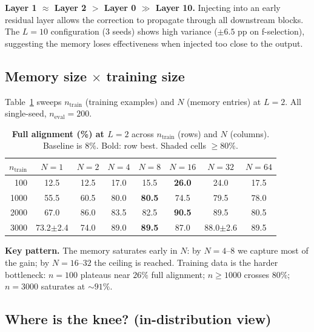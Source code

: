\documentclass[10pt]{article}
\begin{document}
\textbf{Layer 1 $\approx$ Layer 2 $>$ Layer 0 $\gg$ Layer 10.} Injecting
into an early residual layer allows the correction to propagate through
all downstream blocks. The $L{=}10$ configuration (3 seeds) shows high
variance ($\pm 6.5$ pp on f-selection), suggesting the memory loses
effectiveness when injected too close to the output.

\subsection{Memory size $\times$ training size}

Table~\ref{tab:grid} sweeps $n_\text{train}$ (training examples) and $N$
(memory entries) at $L{=}2$. All single-seed, $n_\text{eval}{=}200$.

\begin{table}[ht]
  \centering\small
  \caption{\textbf{Full alignment (\%) at $L{=}2$} across
    $n_\text{train}$ (rows) and $N$ (columns). Baseline is $8\%$. Bold:
    row best. Shaded cells $\geq 80\%$.}
  \label{tab:grid}
  \renewcommand{\arraystretch}{1.15}
  \newcommand{\hlc}[1]{\cellcolor{rowhl}#1}
  \begin{tabular}{r|ccccccc}
    \toprule
    $n_\text{train}$ & $N{=}1$ & $N{=}2$ & $N{=}4$ & $N{=}8$ & $N{=}16$ & $N{=}32$ & $N{=}64$ \\
    \midrule
    100   & 12.5 & 12.5 & 17.0 & 15.5 & \textbf{26.0} & 24.0 & 17.5 \\
    1000  & 55.5 & 60.5 & \hlc{80.0} & \hlc{\textbf{80.5}} & 74.5 & 79.5 & 78.0 \\
    2000  & 67.0 & \hlc{86.0} & \hlc{83.5} & \hlc{82.5} & \hlc{\textbf{90.5}} & \hlc{89.5} & \hlc{80.5} \\
    3000  & 73.2$\pm$2.4 & 74.0 & \hlc{89.0} & \hlc{\textbf{89.5}} & \hlc{87.0} & \hlc{88.0$\pm$2.6} & \hlc{89.5} \\
    \bottomrule
  \end{tabular}
\end{table}

\textbf{Key pattern.} The memory saturates early in $N$: by $N{=}4$--$8$
we capture most of the gain; by $N{=}16$--$32$ the ceiling is reached.
Training data is the harder bottleneck: $n{=}100$ plateaus near $26\%$
full alignment; $n{\geq}1000$ crosses $80\%$; $n{=}3000$ saturates at
$\sim 91\%$.

\subsection{Where is the knee? (in-distribution view)}
\end{document}
